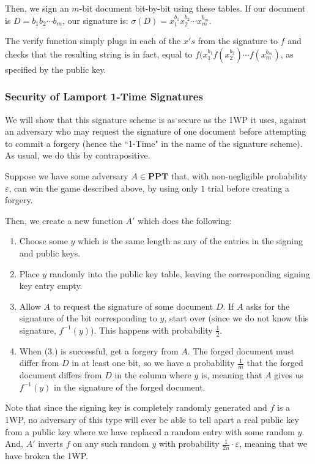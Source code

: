 \documentclass[11pt]{article}
\newcommand{\PPT}{\mathbf{PPT}}
\begin{document}
Then, we sign an \(m\)-bit document bit-by-bit using these tables. If our document is \(D=b_1b_2\cdots b_m\), our signature is: \(\sigma(D)=x^{b_1}_{1}x^{b_2}_{2}\cdots x^{b_m}_{m}\).\bigskip

The verify function simply plugs in each of the \(x's\) from the signature to \(f\) and checks that the resulting string is in fact, equal to \(f(x^{b_1}_{1}f(x^{b_2}_{2})\cdots f(x^{b_m}_{m})\), as specified by the public key.


\subsubsection{Security of Lamport 1-Time Signatures}

We will show that this signature scheme is as secure as the 1WP it uses, against an adversary who may request the signature of one document before attempting to commit a forgery (hence the ``1-Time" in the name of the signature scheme). As usual, we do this by contrapositive.\medskip

Suppose we have some adversary \(A\in\PPT\) that, with non-negligible probability \(\varepsilon\), can win the game described above, by using only \(1\) trial before creating a forgery. \smallskip

Then, we create a new function \(A'\) which does the following:
\begin{enumerate}
\item Choose some \(y\) which is the same length as any of the entries in the signing and public keys.
\item Place \(y\) randomly into the public key table, leaving the corresponding signing key entry empty.
\item Allow \(A\) to request the signature of some document \(D\). If \(A\) asks for the signature of the bit corresponding to \(y\), start over (since we do not know this signature, \(f^{-1}(y)\)). This happens with probability \(\frac{1}{2}\).
\item When (3.) is successful, get a forgery from \(A\). The forged document must differ from \(D\) in at least one bit, so we have a probability \(\frac{1}{m}\) that the forged document differs from \(D\) in the column where \(y\) is, meaning that \(A\) gives us \(f^{-1}(y)\) in the signature of the forged document.
\end{enumerate}

Note that since the signing key is completely randomly generated and \(f\) is a 1WP, no adversary of this type will ever be able to tell apart a real public key from a public key where we have replaced a random entry with some random \(y\). And, \(A'\) inverts \(f\) on any such random \(y\) with probability \(\frac{1}{2n}\cdot\varepsilon\), meaning that we have broken the 1WP.\smallskip
\end{document}
